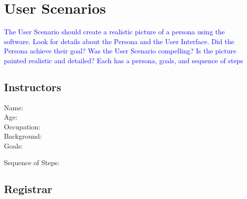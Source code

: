 \documentclass[11pt]{article}
\begin{document}
\section{User Scenarios}  %
\textcolor{blue}{The User Scenario should create a realistic picture of a persona using the software.  
Look for details about the Persona and the User Interface.  
Did the Persona achieve their goal?  
Was the User Scenario compelling?  
Is the picture painted realistic and detailed?
Each has a persona, goals, and sequence of steps}
\subsection{Instructors} %
\begin{description}
\item[Name:]
\item[Age:]
\item[Occupation:]
\item[Background:]

\item[Goals:]
\begin{enumerate}
\end{enumerate}

\item[Sequence of Steps:]
\end{description}


\subsection{Registrar}  %
\end{document}
